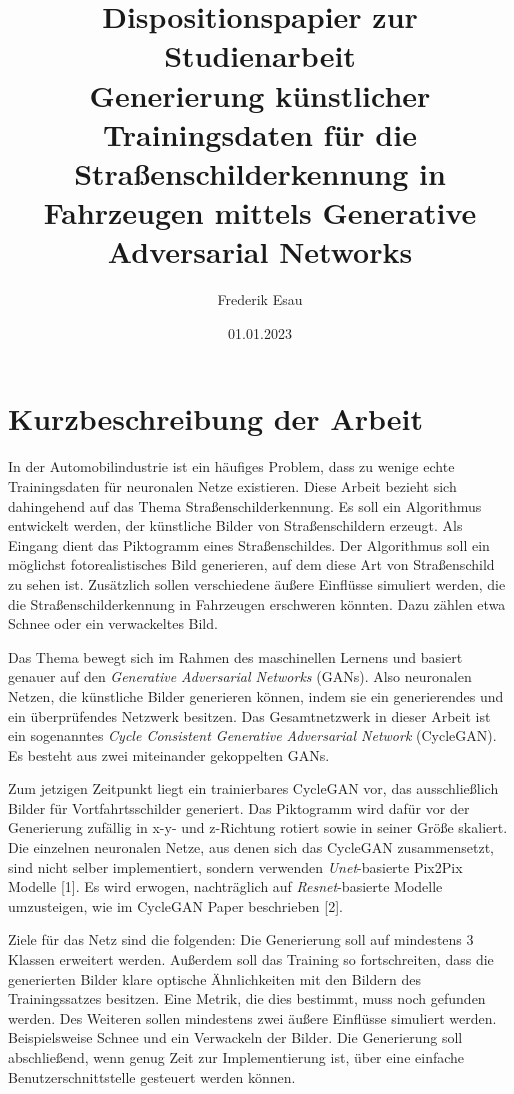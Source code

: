 \documentclass{scrartcl}
\title{Dispositionspapier zur Studienarbeit\\Generierung künstlicher Trainingsdaten für die Straßenschilderkennung in Fahrzeugen mittels Generative Adversarial Networks}
\author{ Frederik Esau }
\date{01.01.2023}
\begin{document}
\maketitle

\section{Kurzbeschreibung der Arbeit}
In der Automobilindustrie ist ein häufiges Problem, dass zu wenige echte Trainingsdaten für neuronalen Netze existieren. Diese Arbeit bezieht sich dahingehend auf das Thema Straßenschilderkennung. Es soll ein Algorithmus entwickelt werden, der künstliche Bilder von Straßenschildern erzeugt. Als Eingang dient das Piktogramm eines Straßenschildes. Der Algorithmus soll ein möglichst fotorealistisches Bild generieren, auf dem diese Art von Straßenschild zu sehen ist. Zusätzlich sollen verschiedene äußere Einflüsse simuliert werden, die die Straßenschilderkennung in Fahrzeugen erschweren könnten. Dazu zählen etwa Schnee oder ein verwackeltes Bild.

Das Thema bewegt sich im Rahmen des maschinellen Lernens und basiert genauer auf den \emph{Generative Adversarial Networks} (GANs). Also neuronalen Netzen, die künstliche Bilder generieren können, indem sie ein generierendes und ein überprüfendes Netzwerk besitzen. Das Gesamtnetzwerk in dieser Arbeit ist ein sogenanntes \emph{Cycle Consistent Generative Adversarial Network} (CycleGAN). Es besteht aus zwei miteinander gekoppelten GANs.

Zum jetzigen Zeitpunkt liegt ein trainierbares CycleGAN vor, das ausschließlich Bilder für Vortfahrtsschilder generiert. Das Piktogramm wird dafür vor der Generierung zufällig in x-y- und z-Richtung rotiert sowie in seiner Größe skaliert. Die einzelnen neuronalen Netze, aus denen sich das CycleGAN zusammensetzt, sind nicht selber implementiert, sondern verwenden \emph{Unet}-basierte Pix2Pix Modelle [1]. Es wird erwogen, nachträglich auf \emph{Resnet}-basierte Modelle umzusteigen, wie im CycleGAN Paper beschrieben [2].

Ziele für das Netz sind die folgenden: Die Generierung soll auf mindestens 3 Klassen erweitert werden. Außerdem soll das Training so fortschreiten, dass die generierten Bilder klare optische Ähnlichkeiten mit den Bildern des Trainingssatzes besitzen. Eine Metrik, die dies bestimmt, muss noch gefunden werden. Des Weiteren sollen mindestens zwei äußere Einflüsse simuliert werden. Beispielsweise Schnee und ein Verwackeln der Bilder. Die Generierung soll abschließend, wenn genug Zeit zur Implementierung ist, über eine einfache Benutzerschnittstelle gesteuert werden können.
\end{document}
